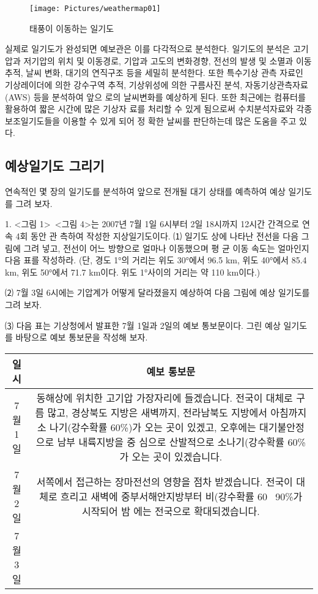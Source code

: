 	\begin{figure}
		\centering
		\texttt{[image: Pictures/weathermap01]}
		\caption{태풍이 이동하는 일기도}
		\label{fig:weathermap01}
	\end{figure}
	
	
	실제로 일기도가 완성되면 예보관은 이를 다각적으로 분석한다. 일기도의 분석은 고기압과
	저기압의 위치 및 이동경로, 기압과 고도의 변화경향, 전선의 발생 및 소멸과 이동 추적, 날씨
	변화, 대기의 연직구조 등을 세밀히 분석한다. 또한 특수기상 관측 자료인 기상레이더에 의한
	강수구역 추적, 기상위성에 의한 구름사진 분석, 자동기상관측자료(AWS) 등을 분석하여 앞으
	로의 날씨변화를 예상하게 된다. 또한 최근에는 컴퓨터를 활용하여 짧은 시간에 많은 기상자
	료를 처리할 수 있게 됨으로써 수치분석자료와 각종 보조일기도들을 이용할 수 있게 되어 정
	확한 날씨를 판단하는데 많은 도움을 주고 있다.
	
	\subsection{예상일기도 그리기}
	
	연속적인 몇 장의 일기도를 분석하여 앞으로 전개될 대기 상태를 예측하여 예상 일기도를 그려 보자.
	
	1. <그림 1>~<그림 4>는 2007년 7월 1일 6시부터 2일 18시까지 12시간 간격으로 연속 4회 동안 관
	측하여 작성한 지상일기도이다.
	⑴ 일기도 상에 나타난 전선을 다음 그림에 그려 넣고, 전선이 어느 방향으로 얼마나 이동했으며 평
	균 이동 속도는 얼마인지 다음 표를 작성하라. (단, 경도 1°의 거리는 위도 30°에서 96.5 km, 위도
	40°에서 85.4 km, 위도 50°에서 71.7 km이다. 위도 1°사이의 거리는 약 110 km이다.)
	
	
	⑵ 7월 3일 6시에는 기압계가 어떻게 달라졌을지 예상하여 다음 그림에 예상 일기도를 그려 보자.
	
	⑶ 다음 표는  기상청에서 발표한 7월 1일과 2일의 예보 통보문이다. 그린 예상 일기도를 바탕으로 예보 통보문을 작성해 보자.
	
	\begin{tabular}{|c|c|}
		\hline 
		일시	& 예보 통보문 \\ 
		\hline 
		7월 1일	& 동해상에 위치한 고기압 가장자리에 들겠습니다.
		전국이 대체로 구름 많고, 경상북도 지방은 새벽까지, 전라남북도 지방에서 아침까지 소
		나기(강수확률 60{\%})가 오는 곳이 있겠고, 오후에는 대기불안정으로 남부 내륙지방을 중
		심으로 산발적으로 소나기(강수확률 60{\%}가 오는 곳이 있겠습니다. \\ 
		\hline 
		7월 2일	& 서쪽에서 접근하는 장마전선의 영향을 점차 받겠습니다.
		전국이 대체로 흐리고 새벽에 중부서해안지방부터 비(강수확률 60~ 90{\%}가 시작되어 밤
		에는 전국으로 확대되겠습니다. \\ 
		\hline 
		7월 3일	&  \\ 
		\hline 
	\end{tabular} 





